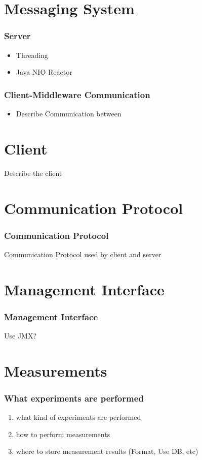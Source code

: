 \documentclass{beamer}
\begin{document}
\section{Messaging System}
\begin{frame}
\frametitle{Server}
\begin{itemize}
\item Threading
\item Java NIO Reactor
\end{itemize}
\end{frame}

\begin{frame}
\frametitle{Client-Middleware Communication}
\begin{itemize}
\item Describe Communication between
\end{itemize}
\end{frame}


\section{Client}
\begin{frame}
Describe the client
\end{frame}


\section{Communication Protocol}
\begin{frame}
\frametitle{Communication Protocol}
Communication Protocol used by client and server
\end{frame}



\section{Management Interface}
\begin{frame}
\frametitle{Management Interface}
Use JMX?
\end{frame}


\section{Measurements}
\begin{frame}
\frametitle{What experiments are performed}


\begin{enumerate}
\item what kind of experiments are performed
\item how to perform measurements
\item where to store measurement results (Format, Use DB, etc)
\end{enumerate}

\end{frame}
\end{document}
